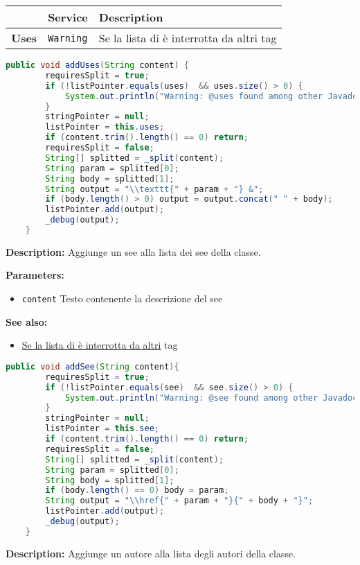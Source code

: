 \documentclass{article}
\begin{document}
\begin{table}[!h]\centering
\begin{tabular}{|l|p{}|p{}|}
\hline & \textbf{Service} & \textbf{Description} \\ \hline
\multirow{1}{*}{\textbf{Uses}}
& \texttt{Warning} & Se la lista di è interrotta da altri tag \\
\hline
\end{tabular}\end{table}
\begin{lstlisting}[language=Java]
    public void addUses(String content) {
        requiresSplit = true;
        if (!listPointer.equals(uses)  && uses.size() > 0) {
            System.out.println("Warning: @uses found among other Javadoc keywords. You should put all @uses together.");
        }
        stringPointer = null;
        listPointer = this.uses;
        if (content.trim().length() == 0) return;
        requiresSplit = false;
        String[] splitted = _split(content);
        String param = splitted[0];
        String body = splitted[1];
        String output = "\\texttt{" + param + "} &";
        if (body.length() > 0) output = output.concat(" " + body);
        listPointer.add(output);
        _debug(output);
    }
\end{lstlisting}
\vspace{0.5cm}
\textbf{Description:}  Aggiunge un see alla lista dei see della classe. 

\textbf{Parameters:}
\begin{itemize}
  \item\texttt{content} Testo contenente la descrizione del see  
\end{itemize}

\textbf{See also:}
\begin{itemize}
  \item\href{Warning}{Se la lista di è interrotta da altri} tag
\end{itemize}

\begin{lstlisting}[language=Java]
    public void addSee(String content){
        requiresSplit = true;
        if (!listPointer.equals(see)  && see.size() > 0) {
            System.out.println("Warning: @see found among other Javadoc keywords. You should put all @see together.");
        }
        stringPointer = null;
        listPointer = this.see;
        if (content.trim().length() == 0) return;
        requiresSplit = false;
        String[] splitted = _split(content);
        String param = splitted[0];
        String body = splitted[1];
        if (body.length() == 0) body = param;
        String output = "\\href{" + param + "}{" + body + "}";
        listPointer.add(output);
        _debug(output);
    }
\end{lstlisting}
\vspace{0.5cm}
\textbf{Description:}  Aggiunge un autore alla lista degli autori della classe. 
\end{document}
